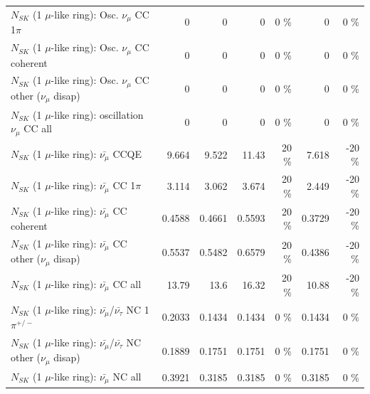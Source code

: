\begin{table}
\begin{tabular}{| l | r | r | r  r | r  r |}
                          $N_{SK}$ (1 $\mu$-like ring): Osc. $\nu_\mu$ CC 1$\pi$ &               0 &               0 &               0 &        0 \%  &               0 &        0 \%  \\ 
                        $N_{SK}$ (1 $\mu$-like ring): Osc. $\nu_\mu$ CC coherent &               0 &               0 &               0 &        0 \%  &               0 &        0 \%  \\ 
         $N_{SK}$ (1 $\mu$-like ring): Osc. $\nu_\mu$ CC other ($\nu_\mu$ disap) &               0 &               0 &               0 &        0 \%  &               0 &        0 \%  \\ 
                      $N_{SK}$ (1 $\mu$-like ring): oscillation $\nu_\mu$ CC all &               0 &               0 &               0 &        0 \%  &               0 &        0 \%  \\ 
\hline
\hline
                              $N_{SK}$ (1 $\mu$-like ring): $\bar{\nu_\mu}$ CCQE &           9.664 &           9.522 &           11.43 &       20 \%  &           7.618 &      -20 \%  \\ 
                         $N_{SK}$ (1 $\mu$-like ring): $\bar{\nu_\mu}$ CC 1$\pi$ &           3.114 &           3.062 &           3.674 &       20 \%  &           2.449 &      -20 \%  \\ 
                       $N_{SK}$ (1 $\mu$-like ring): $\bar{\nu_\mu}$ CC coherent &          0.4588 &          0.4661 &          0.5593 &       20 \%  &          0.3729 &      -20 \%  \\ 
        $N_{SK}$ (1 $\mu$-like ring): $\bar{\nu_\mu}$ CC other ($\nu_\mu$ disap) &          0.5537 &          0.5482 &          0.6579 &       20 \%  &          0.4386 &      -20 \%  \\ 
                          $N_{SK}$ (1 $\mu$-like ring): $\bar{\nu_{\mu}}$ CC all &           13.79 &            13.6 &           16.32 &       20 \%  &           10.88 &      -20 \%  \\ 
\hline
  $N_{SK}$ (1 $\mu$-like ring): $\bar{\nu_\mu}$/$\bar{\nu_\tau}$ NC 1$\pi^{+/-}$ &          0.2033 &          0.1434 &          0.1434 &        0 \%  &          0.1434 &        0 \%  \\ 
$N_{SK}$ (1 $\mu$-like ring): $\bar{\nu_\mu}$/$\bar{\nu_\tau}$ NC other ($\nu_\mu$ disap) &          0.1889 &          0.1751 &          0.1751 &        0 \%  &          0.1751 &        0 \%  \\ 
                          $N_{SK}$ (1 $\mu$-like ring): $\bar{\nu_{\mu}}$ NC all &          0.3921 &          0.3185 &          0.3185 &        0 \%  &          0.3185 &        0 \%  \\ 

\end{tabular}
\end{table}
